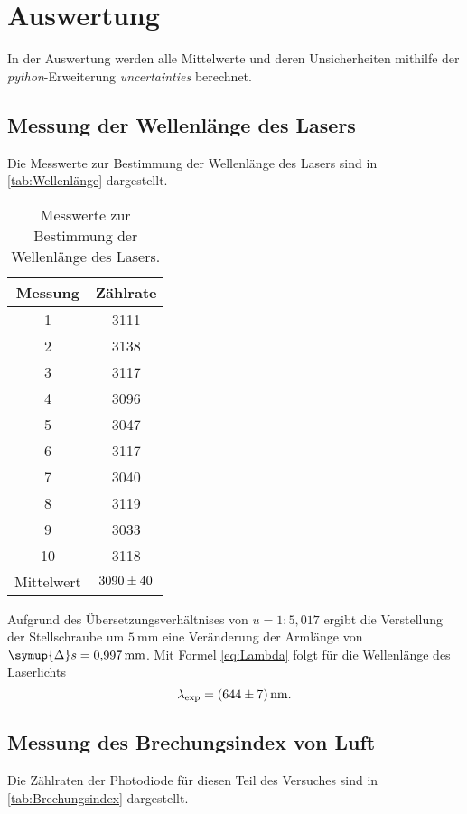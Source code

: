 \section{Auswertung}
\label{sec:Auswertung}
In der Auswertung werden alle Mittelwerte und deren Unsicherheiten mithilfe der \textit{python}-Erweiterung 
\textit{uncertainties} \cite{uncertainties} berechnet.

\subsection{Messung der Wellenlänge des Lasers}
Die Messwerte zur Bestimmung der Wellenlänge des Lasers sind in \autoref{tab:Wellenlänge} dargestellt.
\begin{table} [H]
    \centering
    \caption{Messwerte zur Bestimmung der Wellenlänge des Lasers.}
    \label{tab:Wellenlänge}
    \begin{tabular}{S S}
      \toprule
      {Messung} & {Zählrate} \\
        & 3111 \\
      2  & 3138 \\
      3  & 3117 \\
      4  & 3096 \\
      5  & 3047 \\
      6  & 3117 \\
      7  & 3040 \\
      8  & 3119 \\
      9  & 3033 \\
      10 & 3118 \\
      \midrule
      {Mittelwert} & $\num{3090+-40}$ \\  
      \bottomrule
    \end{tabular}
\end{table}

Aufgrund des Übersetzungsverhältnises von $u = 1:5,017$ ergibt die Verstellung der Stellschraube um $\qty{5}{\milli\metre}$
eine Veränderung der Armlänge von $\symup{\Delta}s=\qty{0.997}{\milli\metre}$. Mit Formel \eqref{eq:Lambda} folgt für die 
Wellenlänge des Laserlichts
\begin{equation*}
    \lambda_{\text{exp}} = \qty{644+-7}{\nano\metre}.
\end{equation*}

\subsection{Messung des Brechungsindex von Luft}
Die Zählraten der Photodiode für diesen Teil des Versuches sind in \autoref{tab:Brechungsindex} dargestellt.
 
